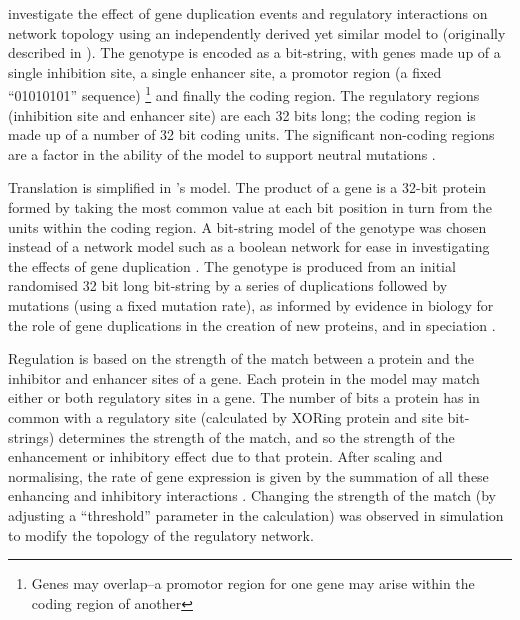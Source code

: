 \cite{Kuo:2006fv} investigate the effect of gene duplication events and regulatory interactions on network topology using an independently derived yet similar model to \cite{Reil:1999rp} (originally described in \cite{Banzhaf:2003kx}). The genotype is encoded as a bit-string, with genes made up of a single inhibition site, a single enhancer site, a promotor region (a fixed ``01010101'' sequence) \footnote{Genes may overlap--a promotor region for one gene may arise within the coding region of another} and finally the coding region. The regulatory regions (inhibition site and enhancer site) are each 32 bits long; the coding region is made up of a number of 32 bit coding units. The significant non-coding regions are a factor in the ability of the model to support neutral mutations \parencite[sec.5]{Banzhaf:2003kx,Kuo:2006fv}.

Translation is simplified in \cite{Kuo:2006fv}'s model. The product of a gene is a 32-bit protein formed by taking the
most common value at each bit position in turn from the units within the coding region. A bit-string model of the genotype
was chosen instead of a network model such as a boolean network for ease in investigating the effects of gene
duplication \parencite[sec. 3 introduction]{Kuo:2006fv}. The  genotype is produced from an initial randomised 32 bit long
bit-string by a series of duplications followed by mutations (using a fixed mutation rate), as informed by evidence in
biology for the role of gene duplications in the creation of new proteins, and in speciation \parencite[sec.
2.3]{Kuo:2006fv}.

Regulation is based on the strength of the match between a protein and the inhibitor and enhancer sites of a gene. Each
protein in the model may match either or both regulatory sites in a gene. The number of bits a protein has in common
with a regulatory site (calculated by XORing protein and site bit-strings) determines the strength of the match, and so
the strength of the enhancement or inhibitory effect due to that protein. After scaling and normalising, the rate of
gene expression is given by the summation of all these enhancing and inhibitory interactions \parencite[sec.
2.2]{Kuo:2006fv}.  Changing the strength of the match (by adjusting a ``threshold'' parameter in the calculation) was
observed in simulation to modify the topology of the regulatory network.

